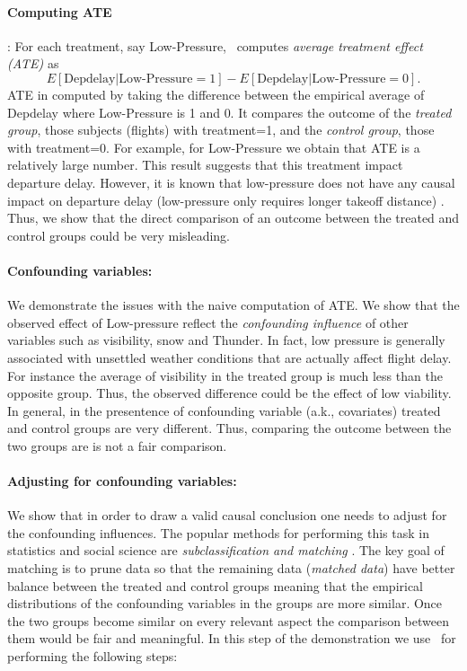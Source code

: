  \paragraph{ \bf Computing ATE}: For each treatment, say Low-Pressure, \GSQL\ computes {\em average treatment effect (ATE)} as $$E[\text{Depdelay}|\text{Low-Pressure}=1] - E[\text{Depdelay}|\text{Low-Pressure}=0].$$
 ATE in computed by taking the difference between the empirical average of Depdelay where Low-Pressure is 1 and 0. It compares the outcome of the {\em treated group}, those subjects (flights) with treatment=1, and the {\em control group}, those with treatment=0.
 For example, for Low-Pressure we obtain that ATE is a relatively large number. This result suggests that this treatment impact departure delay. However, it is known that
  low-pressure does not have any causal impact on departure delay (low-pressure only requires longer takeoff distance) \cite{FAA08}.  Thus, we show that the direct comparison of an outcome between the  treated and control groups could be very misleading.

 \paragraph{\bf Confounding variables:} We demonstrate the issues with the naive computation of
  ATE. We show that the observed  effect of Low-pressure reflect the {\em  confounding influence} of other variables such as visibility, snow and Thunder.  In fact, low pressure is generally associated with unsettled weather conditions that are actually affect flight delay. For instance the average of visibility in the treated group is much less than
  the opposite group. Thus, the observed difference could be the effect of low viability. In general, in the presentence of confounding variable (a.k., covariates) treated and control groups are very different. Thus, comparing the outcome between the two groups are is not a fair comparison.


 \paragraph{\bf Adjusting for confounding variables:}
We show that in order to draw a valid causal conclusion one needs to adjust for the
confounding influences. The popular methods for
performing this task in statistics and social science are {\em subclassification and matching} \cite{Rubin1983b,IacKinPor09,rosenbaum1984reducing}.
The key goal of matching is to prune data so that
the remaining data ({\em matched data}) have better balance between the treated and control groups meaning that the empirical distributions of the confounding variables in the groups are more similar. Once the two groups become similar on every relevant aspect the comparison between them would be fair and meaningful. In this step of the demonstration we use \GSQL\ for performing the following steps:

